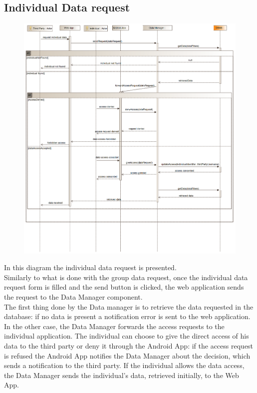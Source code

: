 \subsection{Individual Data request}
\begin{figure}[H]
\centering
\includegraphics[width=\linewidth]{resources/uml/sequence/RequestIndividualData.png}
\end{figure}
In this diagram the individual data request is presented.\\
Similarly to what is done with the group data request, once the individual data request form is filled and the send button is clicked, the web application sends the request to the Data Manager component.\\
The first thing done by the Data manager is to retrieve the data requested in the database: if no data is present a notification error is sent to the web application.\\
In the other case, the Data Manager forwards the access requests to the individual application.
The individual can choose to give the direct access of his data to the third party or deny it through the Android App: if the access request is refused the Android App notifies the Data Manager about the decision, which sends a notification to the third party.
If the individual allows the data access, the Data Manager sends the individual's data, retrieved initially, to the Web App.


